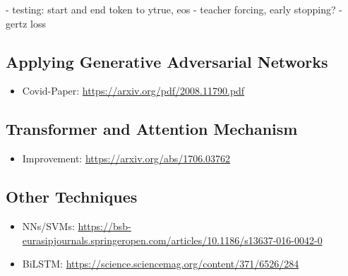 - testing: start and end token to ytrue, eos
- teacher forcing, early stopping?
- gertz loss

\subsection{Applying Generative Adversarial Networks} \label{fundamentalsF}

\begin{itemize}
	\item Covid-Paper: \url{https://arxiv.org/pdf/2008.11790.pdf}
\end{itemize}


\subsection{Transformer and Attention Mechanism} \label{fundamentalsG}

\begin{itemize}
	\item Improvement: \url{https://arxiv.org/abs/1706.03762}
\end{itemize}


\subsection{Other Techniques} \label{fundamentalsH}

\begin{itemize}
	\item NNs/SVMs: \url{https://bsb-eurasipjournals.springeropen.com/articles/10.1186/s13637-016-0042-0}
	\item BiLSTM: \url{https://science.sciencemag.org/content/371/6526/284}
\end{itemize}


\newpage
